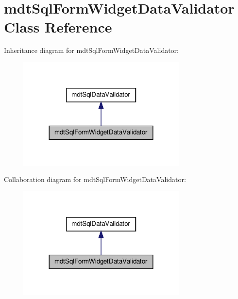 \hypertarget{classmdt_sql_form_widget_data_validator}{
\section{mdtSqlFormWidgetDataValidator Class Reference}
\label{classmdt_sql_form_widget_data_validator}
}


Inheritance diagram for mdtSqlFormWidgetDataValidator:\nopagebreak
\begin{figure}[H]
\begin{center}
\leavevmode
\includegraphics[width=240pt]{classmdt_sql_form_widget_data_validator__inherit__graph}
\end{center}
\end{figure}


Collaboration diagram for mdtSqlFormWidgetDataValidator:\nopagebreak
\begin{figure}[H]
\begin{center}
\leavevmode
\includegraphics[width=240pt]{classmdt_sql_form_widget_data_validator__coll__graph}
\end{center}
\end{figure}
